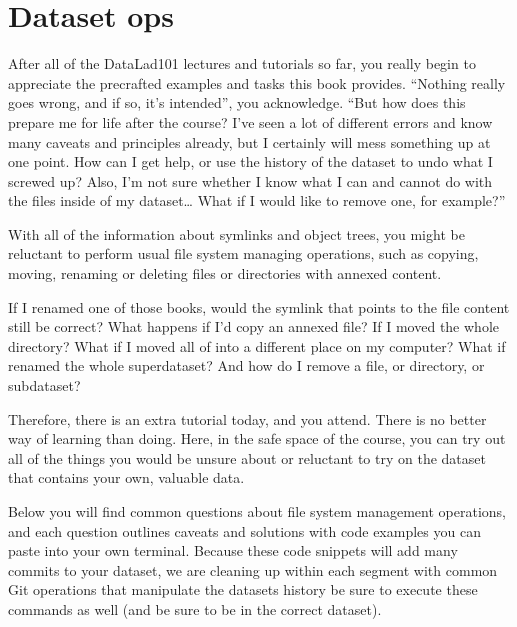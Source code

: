 \chapter{Dataset ops}
\label{\detokenize{basics/101-136-filesystem:dataset-ops}}\label{\detokenize{basics/101-136-filesystem:file-system}}\label{\detokenize{basics/101-136-filesystem:index-0}}\label{\detokenize{basics/101-136-filesystem::doc}}

\sphinxAtStartPar
After all of the DataLad\sphinxhyphen{}101 lectures and tutorials so far, you really begin to
appreciate the pre\sphinxhyphen{}crafted examples and tasks this book provides.
“Nothing really goes wrong, and if so, it’s intended”, you acknowledge.
“But how does this prepare me for life after the course? I’ve seen a lot of
different errors and know many caveats and principles already, but I certainly
will mess something up at one point. How can I get help, or use the history of
the dataset to undo what I screwed up? Also, I’m not sure whether I know what I
can and cannot do with the files inside of my dataset… What if I would
like to remove one, for example?”

\sphinxAtStartPar
With all of the information about symlinks and object trees,
you might be reluctant to perform usual file system managing
operations, such as copying, moving, renaming or deleting
files or directories with annexed content.

\sphinxAtStartPar
If I renamed one of those books, would the symlink that points
to the file content still be correct? What happens if I’d copy
an annexed file?
If I moved the whole  directory? What if I moved
all of  into a different place on my computer?
What if renamed the whole superdataset?
And how do I remove a file, or directory, or subdataset?

\sphinxAtStartPar
Therefore, there is an extra tutorial today, and you attend.
There is no better way of learning than doing. Here, in the
safe space of the  course, you can try out all
of the things you would be unsure about or reluctant to try
on the dataset that contains your own, valuable data.

\sphinxAtStartPar
Below you will find common questions about file system
management operations, and each question outlines caveats and
solutions with code examples you can paste into your own terminal.
Because these code snippets will add many commits to your
dataset, we are cleaning up within each segment with
common Git operations that manipulate the datasets
history \textendash{} be sure to execute these commands as well (and
be sure to be in the correct dataset).


